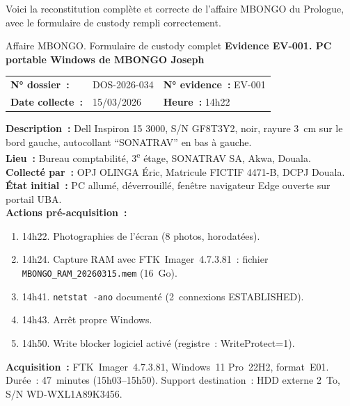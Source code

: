 Voici la reconstitution complète et correcte de l'affaire MBONGO du Prologue,
avec le formulaire de custody rempli correctement.

\begin{boxscenario}{Affaire MBONGO. Formulaire de custody complet}
\textbf{Evidence EV-001. PC portable Windows de MBONGO Joseph}

\begin{tabular}{p{4cm}p{3cm}p{4cm}}
\textbf{N° dossier~:} & DOS-2026-034 &
\textbf{N° evidence~:} EV-001 \\
\textbf{Date collecte~:} & 15/03/2026 & \textbf{Heure~:} 14h22 \\
\end{tabular}

\textbf{Description~:} Dell Inspiron 15 3000, S/N GF8T3Y2, noir, rayure 3~cm
sur le bord gauche, autocollant ``SONATRAV'' en bas à gauche.\\

\textbf{Lieu~:} Bureau comptabilité, 3\textsuperscript{e} étage, SONATRAV SA,
Akwa, Douala.\\

\textbf{Collecté par~:} OPJ OLINGA Éric, Matricule FICTIF 4471-B, DCPJ Douala.\\

\textbf{État initial~:} PC allumé, déverrouillé, fenêtre navigateur Edge
ouverte sur portail UBA.\\

\textbf{Actions pré-acquisition~:}
\begin{enumerate}
    \item 14h22. Photographies de l'écran (8 photos, horodatées).
    \item 14h24. Capture RAM avec FTK~Imager~4.7.3.81~:
          fichier \texttt{MBONGO\_RAM\_20260315.mem} (16~Go).
    \item 14h41. \texttt{netstat -ano} documenté (2~connexions ESTABLISHED).
    \item 14h43. Arrêt propre Windows.
    \item 14h50. Write blocker logiciel activé (registre~: WriteProtect=1).
\end{enumerate}

\textbf{Acquisition~:} FTK~Imager~4.7.3.81, Windows~11 Pro~22H2, format~E01.\\
Durée~: 47~minutes (15h03--15h50). Support destination~: HDD externe 2~To,
S/N WD-WXL1A89K3456.\\

\\
\\
\\
\\


\end{boxscenario}
